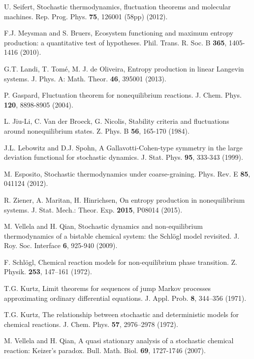 \documentclass[aps,prl,reprint,singlecolumn,superscriptaddress]{revtex4}
\begin{document}
{\begin{thebibliography}{}
 U. Seifert, Stochastic thermodynamics, fluctuation theorems and molecular machines. Rep. Prog. Phys. {\bf 75}, 126001 (58pp) (2012).

 F.J. Meysman and S. Bruers, {Ecosystem functioning and maximum entropy production: a quantitative test of hypotheses.}
Phil. Trans. R. Soc. B {\bf 365}, 1405-1416 (2010).

 G.T. Landi, T. Tom\'e, M. J. de Oliveira, {Entropy production in linear Langevin systems.} J. Phys. A: Math. Theor. {\bf 46}, 395001 (2013).

 P. Gaspard, Fluctuation theorem for nonequilibrium reactions. J. Chem. Phys. {\bf 120}, 8898-8905 (2004).

 L. Jiu-Li, C. Van der Broeck, G. Nicolis, {Stability criteria and fluctuations around nonequilibrium states.} Z. Phys. B {\bf 56}, 165-170 (1984).

 J.L. Lebowitz and D.J. Spohn, 
A Gallavotti-Cohen-type symmetry in the large deviation functional for stochastic dynamics.
J. Stat. Phys. {\bf 95}, 333-343 (1999).

 M. Esposito, {Stochastic thermodynamics under coarse-graining.} Phys. Rev. E {\bf 85}, 041124 (2012).

 R. Ziener, A. Maritan, H. Hinrichsen, {On entropy production in nonequilibrium systems.} J. Stat. Mech.: Theor. Exp. {\bf 2015}, P08014 (2015).

 M. Vellela and H. Qian, Stochastic dynamics and non-equilibrium thermodynamics of a 
bistable chemical system: the Schl\"ogl model revisited. J. Roy. Soc. Interface {\bf 6}, 925-940 (2009).

 F. Schl\"ogl, {Chemical reaction models for non-equilibrium phase transition.} Z. Physik. {\bf 253}, 147–161 (1972). 

 T.G. Kurtz, Limit theorems for sequences of jump Markov processes approximating ordinary differential
equations. J. Appl. Prob. {\bf 8}, 344–356 (1971).

 T.G. Kurtz, The relationship between stochastic and deterministic models for chemical reactions.
J. Chem. Phys. {\bf 57}, 2976–2978 (1972).

 M. Vellela and H. Qian, {A quasi stationary analysis of a stochastic chemical reaction: Keizer's paradox.} Bull. Math. Biol. {\bf 69}, 1727-1746 (2007).


\end{thebibliography}}
\end{document}
